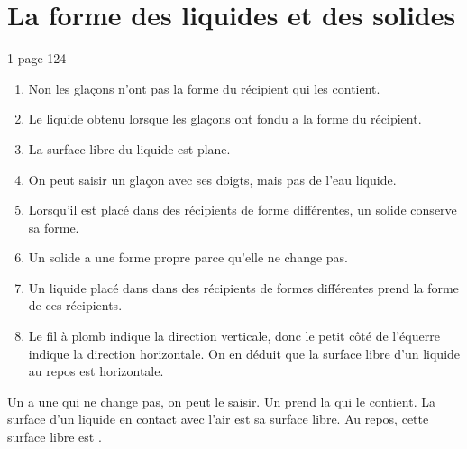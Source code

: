 \documentclass[12pt,a4paper]{article}
\date{}
\title{}
\begin{document}
	
	

\section{La forme des liquides et des solides}

\begin{myact}{1 page 124}
	\begin{enumerate}
		\item Non les glaçons n'ont pas la forme du récipient qui les contient.
		\item Le liquide obtenu lorsque les glaçons ont fondu a la forme du récipient.
		\item La surface libre du liquide est plane.
		\item On peut saisir un glaçon avec ses doigts, mais pas de l'eau liquide.
		\item Lorsqu'il est placé dans des récipients de forme différentes, un solide conserve sa forme.
		\item Un solide a une forme propre parce qu'elle ne change pas.
		\item Un liquide placé dans dans des récipients de formes différentes prend la forme de ces récipients.
		\item Le fil à plomb indique la direction verticale, donc le petit côté de l'équerre indique la direction horizontale. On en déduit que la surface libre d'un liquide au repos est horizontale. 
	\end{enumerate}
\end{myact}

\begin{mybilan}
	Un  a une  qui ne change pas, on peut le saisir. Un  prend la  qui le contient. La surface d'un liquide en contact avec l'air est sa surface libre. Au repos, cette surface libre est .
\end{mybilan}

\begin{myexos}
\end{myexos}
\end{document}
